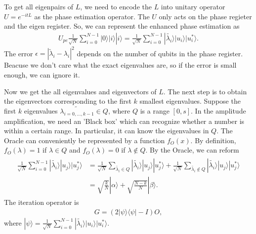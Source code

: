 \documentclass[twocolumn,notitlepage]{revtex4-1}
\def\ket#1{| #1 \rangle}
\def\bra#1{\langle #1 |}
\begin{document}
To get all eigenpairs of $L$, we need to encode the $L$ into unitary operator $U=e^{-itL}$ as the phase estimation operator. The $U$ only acts on the phase regieter and the eigen register. So, we can represent the enhanced phase estimation as 
\begin{align}
    U_{pe}\frac{1}{\sqrt{N}}\sum_{i=0}^{N-1}\ket{0}\ket{i}\ket{i} = \frac{1}{\sqrt{N}}\sum_{i=0}^{N-1}\ket{\tilde{\lambda_{i}}}\ket{u_{i}}\ket{u_{i}^{*}}.
\end{align}
The error $\epsilon = |\widetilde{\lambda}_i-\lambda_i|^2$ depends on the number of qubits in the phase register. Beacuse we don't care what the exact eigenvalues are, so if the error is small enough, we can ignore it.

Now we get the all eigenvalues and eigenvectors of $L$. 
The next step is to obtain the eigenvectors corresponding to the first $k$ smallest eigenvalues.
Suppose the first $k$ eigenvalues $\tilde{\lambda_{i=0,...,k-1}} \in Q$, where $Q$ is a range $[0,s]$. 
In the amplitude amplification, we need an 'Black box' which can recognize whether a number is within a certain range. 
In particular, it can know the eigenvalues in $Q$. 
The Oracle can conveniently be represented by a function $f_{O}(x)$. 
By definition, $f_{O}(\lambda)=1$ if $\lambda \in Q$ and $f_{O}(\lambda)=0$ if $\lambda \notin Q$. 
By the Oracle, we can reform
\begin{align}
    \begin{split}
        \frac{1}{\sqrt{N}}\sum_{i=0}^{N-1}\ket{\tilde{\lambda_{i}}}\ket{u_{j}}\ket{u_{j}^{*}} &= \frac{1}{\sqrt{N}}\sum_{\tilde{\lambda_{i}}\in Q}\ket{\tilde{\lambda_{i}}}\ket{u_{j}}\ket{u_{j}^{*}} + \frac{1}{\sqrt{N}}\sum_{\tilde{\lambda_{i}}\notin Q}\ket{\tilde{\lambda_{i}}}\ket{u_{j}}\ket{u_{j}^{*}}\\
        &=\sqrt{\frac{k}{N}}\ket{\alpha}+\sqrt{\frac{N-k}{N}}\ket{\beta}.
    \end{split}
\end{align}
The iteration operator is
\begin{align}
    G=(2\ket{\psi}\bra{\psi}-I)O,
\end{align}
where $\ket{\psi}=\frac{1}{\sqrt{N}}\sum_{i=0}^{N-1}\ket{\tilde{\lambda_{i}}}\ket{u_{i}}\ket{u_{i}^{*}}$.
\end{document}
